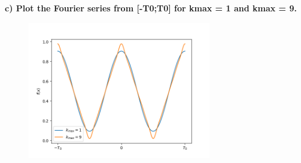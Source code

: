 \textbf{c) Plot the Fourier series from [-T0;T0] for kmax = 1 and kmax = 9.}
\\



\begin{figure}[H]
	\includegraphics[width=8cm]{img/ex_5_c.png}
	\centering
\end{figure}
